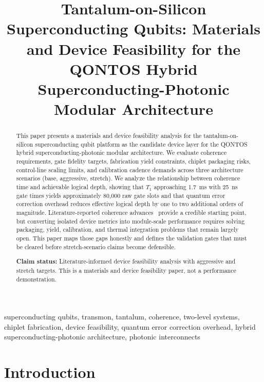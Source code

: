 \documentclass[conference]{IEEEtran}
\begin{document}
\title{Tantalum-on-Silicon Superconducting Qubits: Materials and Device Feasibility for the QONTOS Hybrid Superconducting-Photonic Modular Architecture}
\author{\qontosauthor}
\maketitle

\begin{abstract}
This paper presents a materials and device feasibility analysis for the tantalum-on-silicon superconducting qubit platform as the candidate device layer for the QONTOS hybrid superconducting-photonic modular architecture. We evaluate coherence requirements, gate fidelity targets, fabrication yield constraints, chiplet packaging risks, control-line scaling limits, and calibration cadence demands across three architecture scenarios (base, aggressive, stretch). We analyze the relationship between coherence time and achievable logical depth, showing that $T_1$ approaching 1.7~ms with 25~ns gate times yields approximately 80,000 raw gate slots and that quantum error correction overhead reduces effective logical depth by one to two additional orders of magnitude. Literature-reported coherence advances~\cite{place2021, wang2022, bland2025} provide a credible starting point, but converting isolated device metrics into module-scale performance requires solving packaging, yield, calibration, and thermal integration problems that remain largely open. This paper maps those gaps honestly and defines the validation gates that must be cleared before stretch-scenario claims become defensible.

\textbf{Claim status:} Literature-informed device feasibility analysis with aggressive and stretch targets. This is a materials and device feasibility paper, not a performance demonstration.
\end{abstract}

\begin{IEEEkeywords}
superconducting qubits, transmon, tantalum, coherence, two-level systems, chiplet fabrication, device feasibility, quantum error correction overhead, hybrid superconducting-photonic architecture, photonic interconnects
\end{IEEEkeywords}

\section{Introduction}
\end{document}
